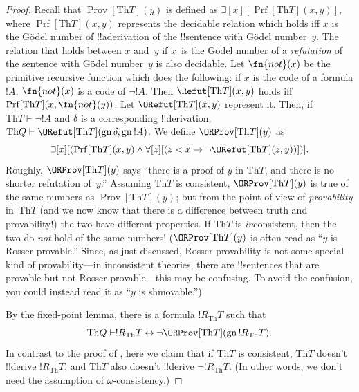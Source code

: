 \documentclass[10pt,a4paper]{article}
\makeatletter
\theoremstyle{plain}
\theoremstyle{definition}
\theoremstyle{remark}
\newcommand*{\ollabel}[1]{\label{#1}}
\newcommand{\olref}{\@ifnextchar[{\olref@i}{\olref@final}}
\def\olref@i[#1]{\@ifnextchar[{\olref@ii}{\olref@final}}
\def\olref@ii[#1]{\@ifnextchar[{\olref@iii}{\olref@final}}
\def\olref@iii[#1]{\olref@final}
\def\olref@final#1{\ref{#1}}
\providecommand{\lif}{\mathbin{\rightarrow}}
\providecommand{\lforall}{\mathord{\forall}}
\providecommand{\lexists}{\mathord{\exists}}
\providecommand{\Proves}{\mathrel{\vdash}}
\providecommand{\Th}{\ensuremath{\mathrm{Th}}}
\providecommand{\Prf}{\operatorname{Prf}}
\providecommand{\gn}{\operatorname{gn}}
\providecommand{\liff}{\mathbin{\leftrightarrow}}
\providecommand{\OProv}{\operatorname{Prov}}
\providecommand{\OPrf}{\operatorname{Prf}}
\makeatother
\begin{document}
\begin{proof}
Recall that $\OProv[\Th{T}](y)$ is defined as $\lexists[x][\OPrf[\Th{T}](x,
  y)]$, where $\OPrf[\Th{T}](x, y)$ represents the decidable relation which
holds iff $x$ is the G\"odel number of !!a{derivation} of the
!!{sentence} with G\"odel number~$y$. The relation that holds between
$x$ and~$y$ if $x$~is the G\"odel number of a \emph{refutation} of the
sentence with G\"odel number~$y$ is also decidable. Let $\fn{not}(x)$
be the primitive recursive function which does the following: if $x$
is the code of a formula $!A$, $\fn{not}(x)$ is a code of $\lnot
!A$. Then $\Refut[\Th{T}](x, y)$ holds iff $\Prf[\Th{T}](x, \fn{not}(y))$.  Let
$\ORefut[\Th{T}](x, y)$ represent it.  Then, if $\Th{T} \Proves \lnot !A$
and $\delta$ is a corresponding !!{derivation}, $\Th{Q} \Proves
\ORefut[\Th{T}](\gn{\delta}, \gn{!A})$.  We define $\ORProv[\Th{T}](y)$ as
\[
\lexists[x][(\OPrf[\Th{T}](x,y) \land \lforall[z][(z < x \lif \lnot
  \ORefut[\Th{T}](z,y))])].
\]
Roughly, $\ORProv[\Th{T}](y)$ says ``there is a proof of $y$ in $\Th{T}$,
and there is no shorter refutation of~$y$.''  Assuming $\Th{T}$ is
consistent, $\ORProv[\Th{T}](y)$ is true of the same numbers as
$\OProv[\Th{T}](y)$; but from the point of view of \emph{provability}
in~$\Th{T}$ (and we now know that there is a difference between truth
and provability!) the two have different properties. If $\Th{T}$ is
\emph{in}consistent, then the two do \emph{not} hold of the same
numbers!{} ($\ORProv[\Th{T}](y)$ is often read as ``$y$ is Rosser
provable.'' Since, as just discussed, Rosser provability is not some
special kind of provability---in inconsistent theories, there are
!!{sentence}s that are provable but not Rosser provable---this may be
confusing. To avoid the confusion, you could instead read it as
``$y$ is shmovable.'')

By the fixed-point lemma, there is a formula $!R_\Th{T}$ such that
\begin{equation}
  \Th{Q} \Proves !R_\Th{T} \liff \lnot \ORProv[\Th{T}](\gn{!R_\Th{T}}).
  \ollabel{RT}
\end{equation}
In contrast to the proof of \olref[1in]{thm:first-incompleteness},
here we claim that if $\Th{T}$ is consistent, $\Th{T}$ doesn't !!{derive}
$!R_\Th{T}$, and $\Th{T}$ also doesn't !!{derive} $\lnot !R_\Th{T}$. (In
other words, we don't need the assumption of $\omega$-consistency.)


\end{proof}
\end{document}
